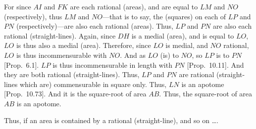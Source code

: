 \begin{Parallel}{}{}
{For since $AI$ and $FK$ are each rational (areas), and are equal to
$LM$ and $NO$ (respectively), thus  $LM$ and $NO$---that is to say, the
(squares) on each of $LP$ and $PN$ (respectively)---are  also
each rational (areas). Thus, $LP$ and $PN$ are also each rational (straight-lines). 
Again, since $DH$ is a medial (area), and is equal to $LO$, $LO$ is thus
also a medial (area). Therefore, since $LO$ is medial, and $NO$ rational, 
$LO$ is thus incommensurable with $NO$. And as $LO$ (is) to $NO$,
so $LP$ is to $PN$ [Prop.~6.1]. $LP$ is
thus incommensurable in length with $PN$ [Prop.~10.11]. And they are both rational
(straight-lines). Thus, $LP$ and $PN$ are rational (straight-lines which are)
commensurable in square only. Thus, $LN$ is an apotome [Prop.~10.73]. And it is the square-root of area $AB$. Thus, the square-root of area $AB$ is an apotome.

Thus, if an area is contained by a rational (straight-line), and
so on \ldots.}
\end{Parallel}

